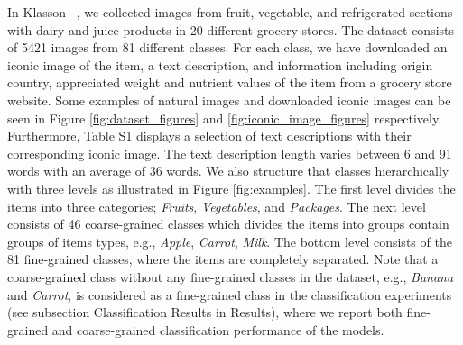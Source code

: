 In Klasson \etal~\cite{klasson2019hierarchical}, we collected images from fruit, vegetable, and refrigerated sections with dairy and juice products in 20 different grocery stores.
The dataset consists of 5421 images from 81 different classes. For each class, we have downloaded an iconic image of the item, a text description, and information including origin country, appreciated weight and nutrient values of the item from a grocery store website. Some examples of natural images and downloaded iconic images can be seen in Figure \ref{fig:dataset_figures} and \ref{fig:iconic_image_figures} respectively. Furthermore, Table S1 displays a selection of text descriptions with their corresponding iconic image. 
The text description length varies between 6 and 91 words with an average of 36 words. 
We also structure that classes hierarchically with three levels as illustrated in Figure \ref{fig:examples}. The first level divides the items into three categories; \textit{Fruits}, \textit{Vegetables}, and \textit{Packages}. The next level consists of 46 coarse-grained classes which divides the items into groups contain groups of items types, e.g., \textit{Apple}, \textit{Carrot}, \textit{Milk}. The bottom level consists of the 81 fine-grained classes, where the items are completely separated. Note that a coarse-grained class without any fine-grained classes in the dataset, e.g., \textit{Banana} and \textit{Carrot}, is considered as a fine-grained class in the classification experiments (see subsection Classification Results in Results),
where we report both fine-grained and coarse-grained classification performance of the models.

